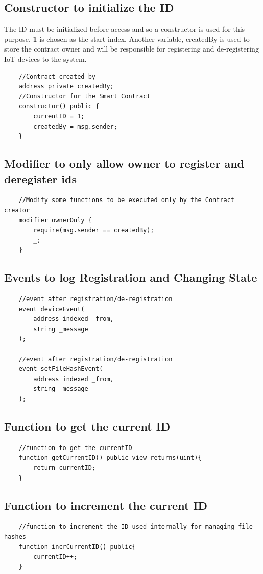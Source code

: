\documentclass[11pt,openright]{report}
\begin{document}
\subsection{Constructor to initialize the ID}
The ID must be initialized before access and so a constructor is used for this purpose. \textbf{1}  is chosen as the start index. Another variable, createdBy is used to store the contract owner and will be responsible for registering and de-registering IoT devices to the system.
\begin{verbatim}
    //Contract created by
    address private createdBy;
    //Constructor for the Smart Contract
    constructor() public {
        currentID = 1;
        createdBy = msg.sender;
    }
\end{verbatim}

\subsection{Modifier to only allow owner to register and deregister ids}
\begin{verbatim}
    //Modify some functions to be executed only by the Contract creator
    modifier ownerOnly {
        require(msg.sender == createdBy);
        _;
    }
\end{verbatim}

\subsection{Events to log Registration and Changing State}
\begin{verbatim}
    //event after registration/de-registration
    event deviceEvent(
        address indexed _from,
        string _message
    );
    
    //event after registration/de-registration
    event setFileHashEvent(
        address indexed _from,
        string _message
    );
\end{verbatim}

\subsection{Function to get the current ID}
\begin{verbatim}
    //function to get the currentID
    function getCurrentID() public view returns(uint){
        return currentID;
    }
\end{verbatim}
\subsection{Function to increment the current ID}
\begin{verbatim}
    //function to increment the ID used internally for managing file-hashes
    function incrCurrentID() public{
        currentID++;
    }
\end{verbatim}
\end{document}
